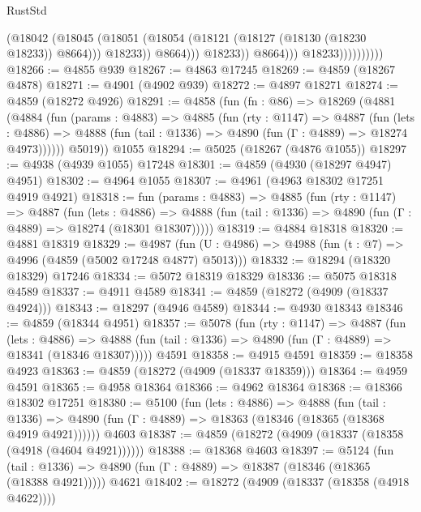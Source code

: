 \begin{lexlean}{RustStd}
\begin{coremodule}
                                      (@18042
                                        (@18045
                                          (@18051
                                            (@18054
                                              (@18121 (@18127 (@18130 (@18230 @18233)) @8664)))
                                            @18233))
                                        @8664)))
                                  @18233))
                              @8664)))
                        @18233))))))))))
@18266 := @4855 @939
@18267 := @4863 @17245
@18269 := @4859 (@18267 @4878)
@18271 := @4901 (@4902 @939)
@18272 := @4897 @18271
@18274 := @4859 (@18272 @4926)
@18291 := @4858
    (fun (fn : @86) =>
    @18269
      (@4881
        (@4884
          (fun (params : @4883) =>
          @4885
            (fun (rty : @1147) =>
            @4887
              (fun (lets : @4886) =>
              @4888 (fun (tail : @1336) => @4890 (fun (Γ : @4889) => @18274 @4973))))))
        @5019))
    @1055
@18294 := @5025 (@18267 (@4876 @1055))
@18297 := @4938 (@4939 @1055) @17248
@18301 := @4859 (@4930 (@18297 @4947) @4951)
@18302 := @4964 @1055
@18307 := @4961 (@4963 @18302 @17251 @4919 @4921)
@18318 := fun (params : @4883) =>
  @4885
    (fun (rty : @1147) =>
    @4887
      (fun (lets : @4886) =>
      @4888 (fun (tail : @1336) => @4890 (fun (Γ : @4889) => @18274 (@18301 @18307)))))
@18319 := @4884 @18318
@18320 := @4881 @18319
@18329 := @4987
    (fun (U : @4986) => @4988 (fun (t : @7) => @4996 (@4859 (@5002 @17248 @4877) @5013)))
@18332 := @18294 (@18320 @18329) @17246
@18334 := @5072 @18319 @18329
@18336 := @5075 @18318 @4589
@18337 := @4911 @4589
@18341 := @4859 (@18272 (@4909 (@18337 @4924)))
@18343 := @18297 (@4946 @4589)
@18344 := @4930 @18343
@18346 := @4859 (@18344 @4951)
@18357 := @5078
    (fun (rty : @1147) =>
    @4887
      (fun (lets : @4886) =>
      @4888 (fun (tail : @1336) => @4890 (fun (Γ : @4889) => @18341 (@18346 @18307)))))
    @4591
@18358 := @4915 @4591
@18359 := @18358 @4923
@18363 := @4859 (@18272 (@4909 (@18337 @18359)))
@18364 := @4959 @4591
@18365 := @4958 @18364
@18366 := @4962 @18364
@18368 := @18366 @18302 @17251
@18380 := @5100
    (fun (lets : @4886) =>
    @4888
      (fun (tail : @1336) =>
      @4890 (fun (Γ : @4889) => @18363 (@18346 (@18365 (@18368 @4919 @4921))))))
    @4603
@18387 := @4859 (@18272 (@4909 (@18337 (@18358 (@4918 (@4604 @4921))))))
@18388 := @18368 @4603
@18397 := @5124
    (fun (tail : @1336) => @4890 (fun (Γ : @4889) => @18387 (@18346 (@18365 (@18388 @4921)))))
    @4621
@18402 := @18272 (@4909 (@18337 (@18358 (@4918 @4622))))

\end{coremodule}
\end{lexlean}
